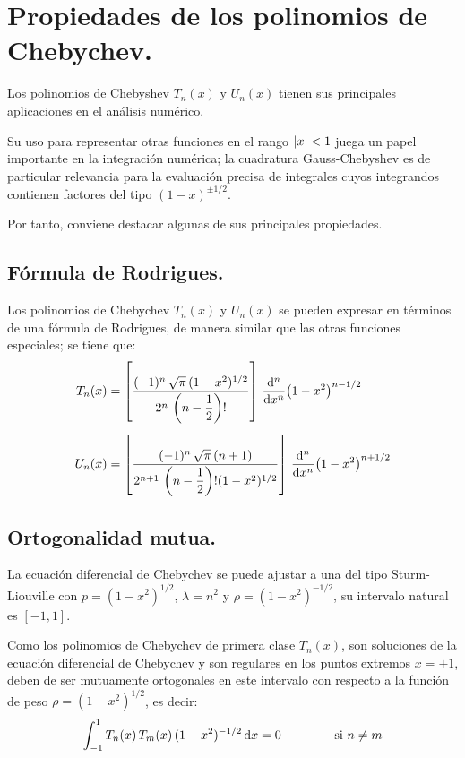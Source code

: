 \section{Propiedades de los polinomios de Chebychev.}

Los polinomios de Chebyshev $T_{n} (x)$ y $U_{n} (x)$ tienen sus principales aplicaciones en el análisis numérico.
\par
Su uso para representar otras funciones en el rango $\abs{x} < 1$ juega un papel importante en la integración numérica; la cuadratura Gauss-Chebyshev es de particular relevancia para la evaluación precisa de integrales cuyos integrandos contienen factores del tipo $(1 - x)^{\pm 1/2}$.
\par
Por tanto, conviene destacar algunas de sus principales propiedades.

\subsection{Fórmula de Rodrigues.}

Los polinomios de Chebychev $T_{n}(x)$ y $U_{n}(x)$ se pueden expresar en términos de una fórmula de Rodrigues, de manera similar que las otras funciones especiales; se tiene que:
\begin{align*}
T_{n}(x) &= \left[ \dfrac{(-1)^{n} \, \sqrt{\pi} \, (1 - x^{2})^{1/2}}{2^{n} \, \left( n - \dfrac{1}{2} \right)!} \right] \, \dv[n]{x} (1 - x^{2})^{n-1/2} \\[0.5em]
U_{n}(x) &= \left[ \dfrac{(-1)^{n} \, \sqrt{\pi} \, (n+1)}{2^{n+1} \, \left( n - \dfrac{1}{2} \right)! (1 - x^{2})^{1/2}} \right] \, \dv[n]{x} (1 - x^{2})^{n+1/2}
\end{align*}

\subsection{Ortogonalidad mutua.}

La ecuación diferencial de Chebychev se puede ajustar a una del tipo Sturm-Liouville con $p = (1 - x^{2})^{1/2}$, $\lambda = n^{2}$ y $\rho = (1 - x^{2})^{-1/2}$, su intervalo natural es $[-1, 1]$.
\par
Como los polinomios de Chebychev de primera clase $T_{n}(x)$, son soluciones de la ecuación diferencial de Chebychev y son regulares en los puntos extremos $x = \pm 1$, deben de ser mutuamente ortogonales en este intervalo con respecto a la función de peso $\rho = (1 - x^{2})^{1/2}$, es decir:
\begin{align}
\int_{-1}^{1} T_{n}(x) \, T_{m}(x) \, (1 - x^{2})^{-1/2} \dd{x} = 0 \hspace{1.5cm} \mbox{si  } n \neq m
\label{ec:ecuacion_18_061}
\end{align}

